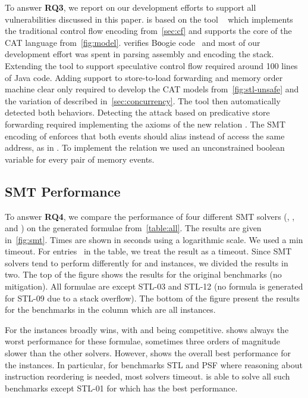 \documentclass[conference]{IEEEtran}
\begin{document}
To answer {\bfseries RQ3}, we report on our development efforts to support all vulnerabilities discussed in this paper.
\zombmc is based on the tool \dartagnan~\cite{dartagnan-svcomp2021} which implements the traditional control flow encoding from~\autoref{sec:cf} and supports the core of the CAT language from~\autoref{fig:model}.
\dartagnan verifies {\selectfont B{о}ogie} code~\cite{leino2008this} and most of our development effort was spent in parsing \xes assembly and encoding the stack.
Extending the tool to support speculative control flow required around 100 lines of Java code.
Adding support to store-to-load forwarding and memory order machine clear only required to develop the CAT models from~\autoref{fig:stl-unsafe} and the variation of \tso described in~\autoref{sec:concurrency}.
The tool then automatically detected both \unsafe behaviors.
Detecting the attack based on predicative store forwarding required implementing the axioms of the new relation .
The SMT encoding of  enforces that both events should alias instead of access the same address, as in .
To implement the  relation we used an unconstrained boolean variable for every pair of memory events.

\subsection{SMT Performance}
\label{sec:perf}

To answer {\bfseries RQ4}, we compare the performance of four different SMT solvers (\zthree, \cvcfour, \yices and \mathsat) on the generated formulae from~\autoref{table:all}.
The results are given in~\autoref{fig:smt}.
Times are shown in seconds using a logarithmic scale.
We used a \usedtimeout min timeout.
For entries \danger\ in the table, we treat the result as a timeout.
Since SMT solvers tend to perform differently for \sat and \unsat instances, we divided the results in two.
The top of the figure shows the results for the original benchmarks (no mitigation). 
All formulae are \sat except STL-03 and STL-12 (no formula is generated for STL-09 due to a stack overflow).
The bottom of the figure present the results for the benchmarks in the \fen column which are all \unsat instances.

For the \sat instances \yices broadly wins, with \zthree and \mathsat being competitive.
\cvcfour shows always the worst performance for these \sat formulae, sometimes three orders of magnitude slower than the other solvers.
However, \cvcfour shows the overall best performance for the \unsat instances.
In particular, for benchmarks STL and PSF where reasoning about instruction reordering is needed, most solvers timeout.
\cvcfour is able to solve all such benchmarks except STL-01 for which \mathsat has the best performance.
\end{document}
